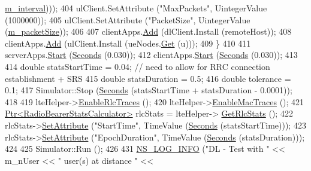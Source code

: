 \begin{DoxyCode}
      \hyperlink{classLenaCqaFfMacSchedulerTestCase1_a1fe70b0e82d40f8e0a6cdc64a6ccf75d}{m\_interval})));
404       ulClient.SetAttribute (\textcolor{stringliteral}{"MaxPackets"}, UintegerValue (1000000));
405       ulClient.SetAttribute (\textcolor{stringliteral}{"PacketSize"}, UintegerValue (\hyperlink{classLenaCqaFfMacSchedulerTestCase1_a5f070f8da521f4003c049f67b62b7b5b}{m\_packetSize}));
406 
407       clientApps.\hyperlink{classns3_1_1ApplicationContainer_ad09ab1a1ad5849d518d5f4c262e38152}{Add} (dlClient.Install (remoteHost));
408       clientApps.\hyperlink{classns3_1_1ApplicationContainer_ad09ab1a1ad5849d518d5f4c262e38152}{Add} (ulClient.Install (ueNodes.\hyperlink{classns3_1_1NodeContainer_a9ed96e2ecc22e0f5a3d4842eb9bf90bf}{Get} (u)));
409     \}
410 
411   serverApps.\hyperlink{classns3_1_1ApplicationContainer_a8eff87926507020bbe3e1390358a54a7}{Start} (\hyperlink{group__timecivil_ga33c34b816f8ff6628e33d5c8e9713b9e}{Seconds} (0.030));
412   clientApps.\hyperlink{classns3_1_1ApplicationContainer_a8eff87926507020bbe3e1390358a54a7}{Start} (\hyperlink{group__timecivil_ga33c34b816f8ff6628e33d5c8e9713b9e}{Seconds} (0.030));
413 
414   \textcolor{keywordtype}{double} statsStartTime = 0.04; \textcolor{comment}{// need to allow for RRC connection establishment + SRS}
415   \textcolor{keywordtype}{double} statsDuration = 0.5;
416   \textcolor{keywordtype}{double} tolerance = 0.1;
417   Simulator::Stop (\hyperlink{group__timecivil_ga33c34b816f8ff6628e33d5c8e9713b9e}{Seconds} (statsStartTime + statsDuration - 0.0001));
418 
419   lteHelper->\hyperlink{classns3_1_1LteHelper_abadfdd04d30b261e9b6f0846b4784928}{EnableRlcTraces} ();
420   lteHelper->\hyperlink{classns3_1_1LteHelper_affa3a12841520407d3662417fe41863d}{EnableMacTraces} ();
421   \hyperlink{classns3_1_1Ptr}{Ptr<RadioBearerStatsCalculator>} rlcStats = lteHelper->
      \hyperlink{classns3_1_1LteHelper_a6eb438ccf69642e3863adea4991fa2ca}{GetRlcStats} ();
422   rlcStats->\hyperlink{classns3_1_1ObjectBase_ac60245d3ea4123bbc9b1d391f1f6592f}{SetAttribute} (\textcolor{stringliteral}{"StartTime"}, TimeValue (\hyperlink{group__timecivil_ga33c34b816f8ff6628e33d5c8e9713b9e}{Seconds} (statsStartTime)));
423   rlcStats->\hyperlink{classns3_1_1ObjectBase_ac60245d3ea4123bbc9b1d391f1f6592f}{SetAttribute} (\textcolor{stringliteral}{"EpochDuration"}, TimeValue (\hyperlink{group__timecivil_ga33c34b816f8ff6628e33d5c8e9713b9e}{Seconds} (statsDuration)));
424 
425   Simulator::Run ();
426 
431   \hyperlink{group__logging_gafbd73ee2cf9f26b319f49086d8e860fb}{NS\_LOG\_INFO} (\textcolor{stringliteral}{"DL - Test with "} << m\_nUser << \textcolor{stringliteral}{" user(s) at distance "} << 

\end{DoxyCode}
